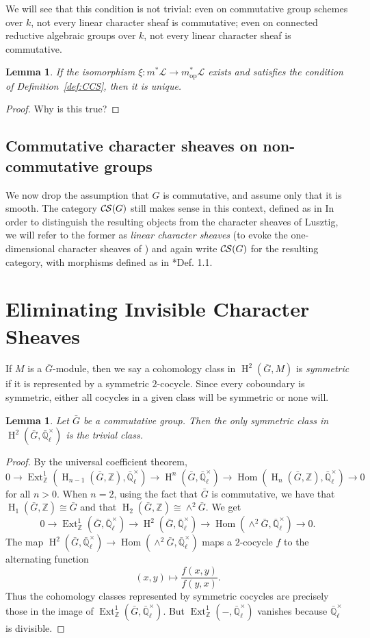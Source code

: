 \documentclass[10pt]{amsart}
\theoremstyle{plain}
\newtheorem{lemma}[theorem]{Lemma}
\theoremstyle{definition}
\newcommand{\ZZ}{{\mathbb{Z}}}
\newcommand{\EE}{\mathbb{\bar Q}_\ell}
\newcommand{\Fq}{k}
\newcommand{\EEx}{\EE^\times}
\DeclareMathOperator{\Hom}{Hom}
\DeclareMathOperator{\Ext}{Ext}
\DeclareMathOperator{\Hh}{H}
\newcommand{\op}{_{\operatorname{op}}}
\newcommand{\cs}[1]{{\mathcal{#1}}}
\newcommand{\CS}{{\mathcal{C\hskip-0.8pt S}}}
\newcommand{\bG}{\bar{G}}
\begin{document}
We will see that this condition is not trivial: even on commutative group schemes over $\Fq$, not every linear character sheaf is commutative; even on connected reductive algebraic groups over $\Fq$, not every linear character sheaf is commutative.

\begin{lemma}\label{lem:symmetry}
If the isomorphism $\xi: m^* \cs{L} \to m\op^* \cs{L}$ exists and satisfies the condition of Definition~\ref{def:CCS}, then it is unique.
\end{lemma}

\begin{proof}
Why is this true?
\end{proof}

\subsection{Commutative character sheaves on non-commutative groups}

We now drop the assumption that $G$ is commutative, and assume only that it is smooth.
The category $\CS(G)$ still makes sense in this context, defined as in 
In order to distinguish the resulting objects from
the character sheaves of Lusztig, we will refer to the former as \emph{linear character sheaves} (to evoke the one-dimensional character sheaves of \cite{Kamgarpour})
and again write $\CS(G)$ for the resulting category, with morphisms defined as in \cite{cunningham-roe:13a}*{Def. 1.1}.


\section{Eliminating Invisible Character Sheaves}\label{sec:defect}

If $M$ is a $\bG$-module, then we say a cohomology class in $\Hh^2(\bG, M)$ is \emph{symmetric} if it is represented
by a symmetric $2$-cocycle.  Since every coboundary is symmetric, either all cocycles in a given class will be symmetric
or none will.

\begin{lemma} \label{lem:symtriv}
Let $\bG$ be a commutative group.  Then the only symmetric class in $\Hh^2(\bG, \EEx)$ is the trivial class.
\end{lemma}

\begin{proof}
By the universal coefficient theorem,
\[
0 \to \Ext^1_\ZZ(\Hh_{n-1}(\bG, \ZZ), \EEx) \to \Hh^n(\bG, \EEx) \to \Hom(\Hh_n(\bG, \ZZ), \EEx) \to 0
\]
for all $n > 0$.  When $n = 2$, using the fact that $\bG$ is commutative, we have that $\Hh_1(\bG, \ZZ) \cong \bG$
and that $\Hh_2(\bG, \ZZ) \cong \wedge^2 \bG$. We get
\[
0 \to \Ext^1_\ZZ(\bG, \EEx) \to \Hh^2(\bG, \EEx) \to \Hom(\wedge^2 \bG, \EEx) \to 0.
\]
The map $\Hh^2(\bG, \EEx) \to \Hom(\wedge^2 \bG, \EEx)$ maps a $2$-cocycle $f$ to the alternating function
\[
(x,y) \mapsto \frac{f(x,y)}{f(y,x)}.
\]
Thus the cohomology classes represented by symmetric cocycles are precisely those in the image of $\Ext^1_\ZZ(\bG, \EEx)$.
But $\Ext^1_\ZZ(-, \EEx)$ vanishes because $\EEx$ is divisible.
\end{proof}
\end{document}
